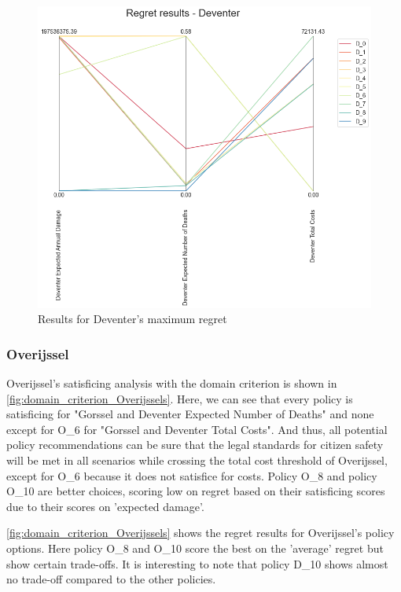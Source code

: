 \begin{figure}[H]
\begin{minipage}[b]{0.4\textwidth}
    \includegraphics[width=1.2\textwidth]{report/figures/results/regret_figure_Deventer.png}
    \caption{Results for Deventer's maximum regret}
    \label{fig:regret_Deventers}
  \end{minipage}
\end{figure}

\subsubsection{Overijssel}
Overijssel's satisficing analysis with the domain criterion is shown in \autoref{fig:domain_criterion_Overijssels}. Here, we can see that every policy is satisficing for "Gorssel and Deventer Expected Number of Deaths" and none except for O\_6 for "Gorssel and Deventer Total Costs". And thus, all potential policy recommendations can be sure that the legal standards for citizen safety will be met in all scenarios while crossing the total cost threshold of Overijssel, except for O\_6 because it does not satisfice for costs. 
Policy O\_8 and policy O\_10 are better choices, scoring low on regret based on their satisficing scores due to their scores on 'expected damage'. \newline

\noindent \autoref{fig:domain_criterion_Overijssels} shows the regret results for Overijssel's policy options. Here policy O\_8 and O\_10 score the best on the 'average' regret but show certain trade-offs. It is interesting to note that policy D\_10 shows almost no trade-off compared to the other policies.

